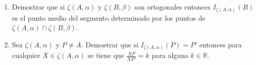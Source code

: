 \documentclass[10pt]{report}
\newcommand{\R}{\mathbb R}
\begin{document}
\begin{enumerate}
\item Demostrar que si $\zeta(A,\alpha)$ y $\zeta(B, \beta)$ son ortogonales entonces $I_{\zeta(A, \alpha)}(B)$ es el punto medio del segmento determinado por los puntos de $\zeta(A,\alpha) \cap \zeta(B,\beta)$.



\item Sea $\zeta(A, \alpha)$ y $P\neq A$. Demostrar que si $I_{\zeta(A, \alpha)}(P)=P'$ entonces para cualquier $X \in \zeta(A, \alpha)$ se tiene que $\frac{XP}{XP'} = k$ para alguna $k \in \R$.


\end{enumerate}
\end{document}
